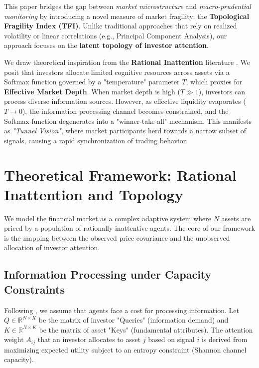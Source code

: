 \documentclass[review]{elsarticle}
\begin{document}
This paper bridges the gap between \textit{market microstructure} and \textit{macro-prudential monitoring} by introducing a novel measure of market fragility: the \textbf{Topological Fragility Index (TFI)}. Unlike traditional approaches that rely on realized volatility or linear correlations (e.g., Principal Component Analysis), our approach focuses on the \textbf{latent topology of investor attention}.

We draw theoretical inspiration from the \textbf{Rational Inattention} literature \citep{sims2003implications, matejka2014rational}. We posit that investors allocate limited cognitive resources across assets via a Softmax function governed by a "temperature" parameter $T$, which proxies for \textbf{Effective Market Depth}. When market depth is high ($T \gg 1$), investors can process diverse information sources. However, as effective liquidity evaporates ($T \to 0$), the information processing channel becomes constrained, and the Softmax function degenerates into a "winner-take-all" mechanism. This manifests as \textit{"Tunnel Vision"}, where market participants herd towards a narrow subset of signals, causing a rapid synchronization of trading behavior.

\section{Theoretical Framework: Rational Inattention and Topology}

We model the financial market as a complex adaptive system where $N$ assets are priced by a population of rationally inattentive agents. The core of our framework is the mapping between the observed price covariance and the unobserved allocation of investor attention.

\subsection{Information Processing under Capacity Constraints}

Following \cite{matejka2014rational}, we assume that agents face a cost for processing information. Let $Q \in \mathbb{R}^{N \times K}$ be the matrix of investor "Queries" (information demand) and $K \in \mathbb{R}^{N \times K}$ be the matrix of asset "Keys" (fundamental attributes). The attention weight $A_{ij}$ that an investor allocates to asset $j$ based on signal $i$ is derived from maximizing expected utility subject to an entropy constraint (Shannon channel capacity).
\end{document}
